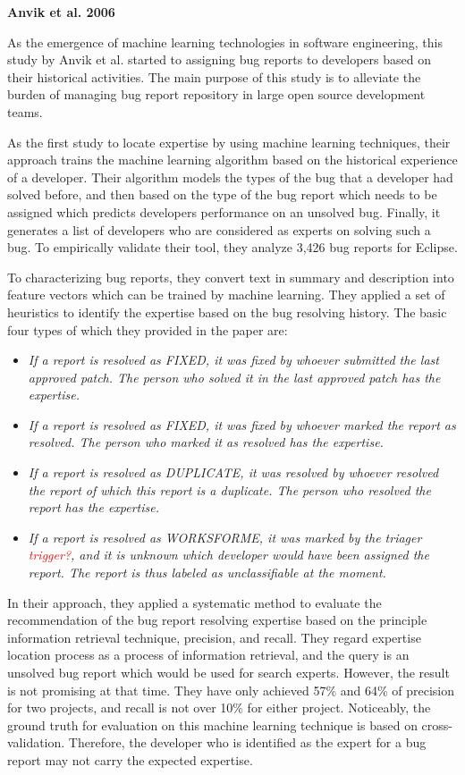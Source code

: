 \textbf{Anvik et al. 2006}

As the emergence of machine learning technologies in software engineering, this study by Anvik et al. started to assigning bug reports to developers based on their historical activities. The main purpose of this study is to alleviate the burden of managing bug report repository in large open source development teams.

As the first study to locate expertise by using machine learning techniques, their approach trains the machine learning algorithm based on the historical experience of a developer. Their algorithm models the types of the bug that a developer had solved before, and then based on the type of the bug report which needs to be assigned which predicts developers performance on an unsolved bug. Finally, it generates a list of developers who are considered as experts on solving such a bug. To empirically validate their tool, they analyze 3,426 bug reports for Eclipse.

To characterizing bug reports, they convert text in summary and description into feature vectors which can be trained by machine learning. They applied a set of heuristics to identify the expertise based on the bug resolving history. The basic four types of which they provided in the paper are:

\begin{itemize}
\item \textit{If a report is resolved as FIXED, it was fixed by whoever submitted the last approved patch. The person who solved it in the last approved patch has the expertise.}

\item \textit{If a report is resolved as FIXED, it was fixed by whoever marked the report as resolved. The person who marked it as resolved has the expertise.}

\item \textit{If a report is resolved as DUPLICATE, it was resolved by whoever resolved the report of which this report is a duplicate. The person who resolved the report has the expertise.}

\item \textit{If a report is resolved as WORKSFORME, it was marked by the triager \textcolor{red}{trigger?}, and it is unknown which developer would have been assigned the report. The report is thus labeled as unclassifiable at the moment.}
\end{itemize}

In their approach, they applied a systematic method to evaluate the recommendation of the bug report resolving expertise based on the principle information retrieval technique, precision, and recall. They regard expertise location process as a process of information retrieval, and the query is an unsolved bug report which would be used for search experts. However, the result is not promising at that time. They have only achieved 57\% and 64\% of precision for two projects, and recall is not over 10\% for either project. Noticeably, the ground truth for evaluation on this machine learning technique is based on cross-validation. Therefore, the developer who is identified as the expert for a bug report may not carry the expected expertise.


